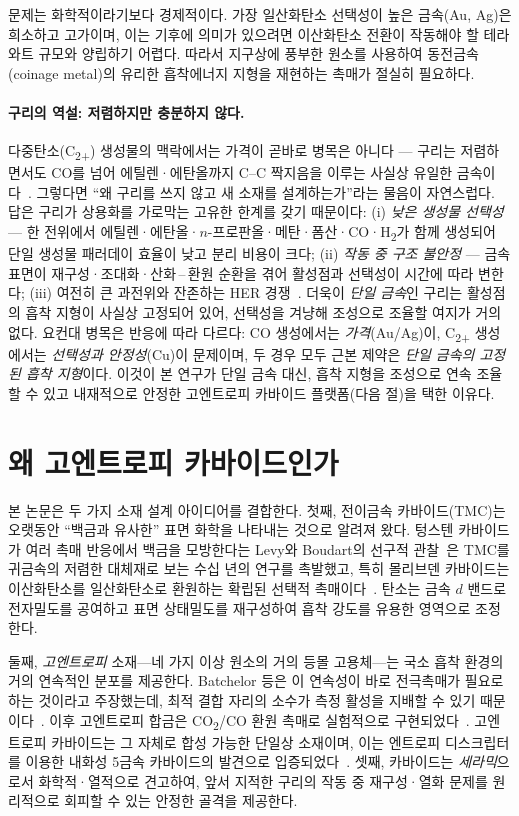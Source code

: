 \documentclass[11pt,a4paper]{report}
\begin{document}
문제는 화학적이라기보다 경제적이다. 가장 일산화탄소 선택성이 높은 금속(Au, Ag)은 희소하고
고가이며, 이는 기후에 의미가 있으려면 이산화탄소 전환이 작동해야 할 테라와트 규모와 양립하기
어렵다. 따라서 지구상에 풍부한 원소를 사용하여 동전금속(coinage metal)의 유리한 흡착에너지
지형을 재현하는 촉매가 절실히 필요하다.

\paragraph{구리의 역설: 저렴하지만 충분하지 않다.} 다중탄소(C\textsubscript{2+}) 생성물의 맥락에서는
가격이 곧바로 병목은 아니다 --- 구리는 저렴하면서도 CO를 넘어 에틸렌·에탄올까지 C--C 짝지음을
이루는 사실상 유일한 금속이다~\cite{nitopi2019}. 그렇다면 ``왜 구리를 쓰지 않고 새 소재를
설계하는가''라는 물음이 자연스럽다. 답은 구리가 상용화를 가로막는 고유한 한계를 갖기 때문이다:
(i) \emph{낮은 생성물 선택성} --- 한 전위에서 에틸렌·에탄올·$n$-프로판올·메탄·폼산·CO·H\textsubscript{2}가
함께 생성되어 단일 생성물 패러데이 효율이 낮고 분리 비용이 크다; (ii) \emph{작동 중 구조 불안정} ---
금속 표면이 재구성·조대화·산화\,--\,환원 순환을 겪어 활성점과 선택성이 시간에 따라 변한다;
(iii) 여전히 큰 과전위와 잔존하는 HER 경쟁~\cite{nitopi2019}. 더욱이 \emph{단일 금속}인 구리는 활성점의
흡착 지형이 사실상 고정되어 있어, 선택성을 겨냥해 조성으로 조율할 여지가 거의 없다. 요컨대 병목은
반응에 따라 다르다: CO 생성에서는 \emph{가격}(Au/Ag)이, C\textsubscript{2+} 생성에서는 \emph{선택성과
안정성}(Cu)이 문제이며, 두 경우 모두 근본 제약은 \emph{단일 금속의 고정된 흡착 지형}이다. 이것이
본 연구가 단일 금속 대신, 흡착 지형을 조성으로 연속 조율할 수 있고 내재적으로 안정한 고엔트로피
카바이드 플랫폼(다음 절)을 택한 이유다.

\section{왜 고엔트로피 카바이드인가}
본 논문은 두 가지 소재 설계 아이디어를 결합한다. 첫째, 전이금속 카바이드(TMC)는 오랫동안
``백금과 유사한'' 표면 화학을 나타내는 것으로 알려져 왔다. 텅스텐 카바이드가 여러 촉매 반응에서
백금을 모방한다는 Levy와 Boudart의 선구적 관찰~\cite{levy1973}은 TMC를 귀금속의 저렴한 대체재로
보는 수십 년의 연구를 촉발했고, 특히 몰리브덴 카바이드는 이산화탄소를 일산화탄소로 환원하는
확립된 선택적 촉매이다~\cite{porosoff2014}. 탄소는 금속 $d$ 밴드로 전자밀도를 공여하고 표면
상태밀도를 재구성하여 흡착 강도를 유용한 영역으로 조정한다.

둘째, \emph{고엔트로피} 소재---네 가지 이상 원소의 거의 등몰 고용체---는 국소 흡착 환경의 거의
연속적인 분포를 제공한다. Batchelor 등은 이 연속성이 바로 전극촉매가 필요로 하는 것이라고
주장했는데, 최적 결합 자리의 소수가 측정 활성을 지배할 수 있기 때문이다~\cite{batchelor2019}.
이후 고엔트로피 합금은 CO\textsubscript{2}/CO 환원 촉매로 실험적으로 구현되었다~\cite{nellaiappan2020}.
고엔트로피 카바이드는 그 자체로 합성 가능한 단일상 소재이며, 이는 엔트로피 디스크립터를 이용한
내화성 5금속 카바이드의 발견으로 입증되었다~\cite{sarker2018}. 셋째, 카바이드는 \emph{세라믹}으로서
화학적·열적으로 견고하여, 앞서 지적한 구리의 작동 중 재구성·열화 문제를 원리적으로 회피할 수 있는
안정한 골격을 제공한다.
\end{document}
